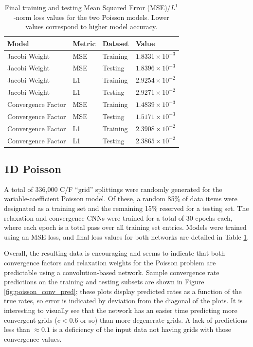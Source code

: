 \documentclass[review]{siamart190516}
\begin{document}
\begin{table}[t]
\centering
\begin{tabular}{|l|l|l|l|}
\hline
Model & Metric & Dataset & Value \\

\hline
Jacobi Weight & MSE & Training & $1.8331 \times 10^{-3}$ \\
Jacobi Weight & MSE & Testing & $1.8396 \times 10^{-3}$ \\
Jacobi Weight & L1 & Training & $2.9254 \times 10^{-2}$ \\
Jacobi Weight & L1 & Testing & $2.9271 \times 10^{-2}$ \\
\hline
Convergence Factor & MSE & Training & $1.4839 \times 10^{-3}$ \\
Convergence Factor & MSE & Testing & $1.5171 \times 10^{-3}$ \\
Convergence Factor & L1 & Training & $2.3908 \times 10^{-2}$ \\
Convergence Factor & L1 & Testing & $2.3865 \times 10^{-2}$ \\
\hline
\end{tabular}
\caption{Final training and testing Mean Squared Error (MSE)/$L^1$-norm loss values for the two Poisson models.  Lower values correspond to higher model accuracy.}
\label{tab:poisson_loss}
\end{table}

\subsection{1D Poisson}

A total of 336,000 C/F ``grid'' splittings were randomly generated for the variable-coefficient Poisson model.  Of these, a random 85\% of data items were designated as a training set and the remaining 15\% reserved for a testing set.  The relaxation and convergence CNNs were trained for a total of 30 epochs each, where each epoch is a total pass over all training set entries.  Models were trained using an MSE loss, and final loss values for both networks are detailed in Table \ref{tab:poisson_loss}.

Overall, the resulting data is encouraging and seems to indicate that both convergence factors and relaxation weights for the Poisson problem are predictable using a convolution-based network.  Sample convergence rate predictions on the training and testing subsets are shown in Figure \ref{fig:poisson_conv_pred}; these plots display predicted rates as a function of the true rates, so error is indicated by deviation from the diagonal of the plots.  It is interesting to visually see that the network has an easier time predicting more convergent grids ($c < 0.6$ or so) than more degenerate grids.  A lack of predictions less than $\approx 0.1$ is a deficiency of the input data not having grids with those convergence values.
\end{document}
